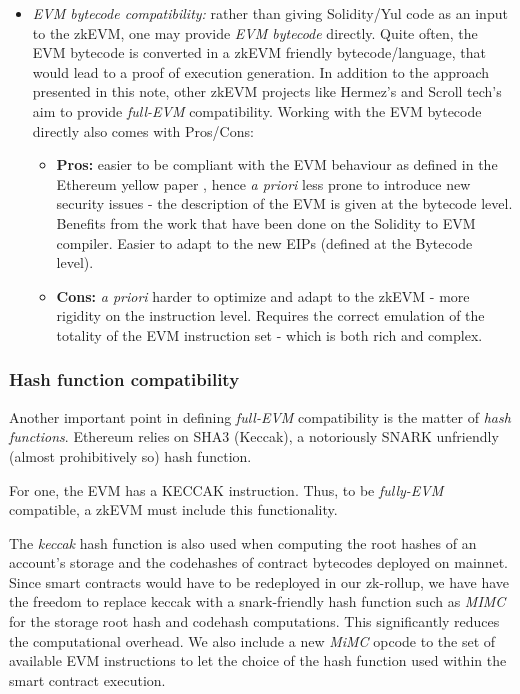 \begin{itemize}
    \item \textit{EVM bytecode compatibility:} rather than giving Solidity/Yul code as an input to the zkEVM, one may provide \textit{EVM bytecode} directly. Quite often, the EVM bytecode is converted in a zkEVM friendly bytecode/language, that would lead to a proof of execution generation. In addition to the approach presented in this note, other zkEVM projects like Hermez's \cite{hermez} and Scroll tech's \cite{scroll} aim to provide \textit{full-EVM} compatibility. Working with the EVM bytecode directly also comes with Pros/Cons:
    \begin{itemize}
        \item \textbf{Pros:} easier to be compliant with the EVM behaviour as defined in the Ethereum yellow paper \cite{EthYellowpaperBerlin}, hence \textit{a priori} less prone to introduce new security issues - the description of the EVM is given at the bytecode level. Benefits from the work that have been done on the Solidity to EVM compiler. Easier to adapt to the new EIPs (defined at the Bytecode level). 
        \item \textbf{Cons:} \textit{a priori} harder to optimize and adapt to the zkEVM - more rigidity on the instruction level. Requires the correct emulation of the totality of the EVM instruction set - which is both rich and complex.
    \end{itemize}
\end{itemize}


\subsubsection{Hash function compatibility}
Another important point in defining \textit{full-EVM} compatibility is the matter of \textit{hash functions}. Ethereum relies on SHA3 (Keccak), a notoriously SNARK unfriendly (almost prohibitively so) hash function.

For one, the EVM has a KECCAK instruction. Thus, to be \textit{fully-EVM} compatible, a zkEVM must include this functionality.

The \textit{keccak} hash function is also used when computing the root hashes of an account's storage and the codehashes of contract bytecodes deployed on mainnet. Since smart contracts would have to be redeployed in our zk-rollup, we have have the freedom to replace keccak with a snark-friendly hash function such as \textit{MIMC} for the storage root hash and codehash computations. This significantly reduces the computational overhead. We also include a new \textit{MiMC} opcode to the set of available EVM instructions to let the choice of the hash function used within the smart contract execution. 

